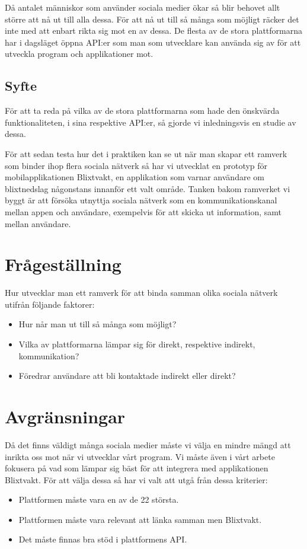 \documentclass{sigchi}
\begin{document}
Då antalet människor som använder sociala medier ökar så blir behovet allt större att nå ut till alla dessa. 
För att nå ut till så många som möjligt räcker det inte med att enbart rikta sig mot en av dessa. De 
flesta av de stora plattformarna har i dagsläget öppna API:er som man som utvecklare kan använda sig av 
för att utveckla program och applikationer mot.

\subsection{Syfte}
För att ta reda på vilka av de stora plattformarna som hade den önskvärda funktionaliteten, 
i sina respektive API:er, så gjorde vi inledningsvis en studie av dessa.

För att sedan testa hur det i praktiken kan se ut när man skapar ett ramverk som binder 
ihop flera sociala nätverk så har vi utvecklat en prototyp för mobilapplikationen Blixtvakt, 
en applikation som varnar användare om blixtnedslag någonstans innanför ett valt område. Tanken 
bakom ramverket vi byggt är att försöka utnyttja sociala nätverk som en kommunikationskanal mellan 
appen och användare, exempelvis för att skicka ut information, samt mellan användare.

\section{Frågeställning}
Hur utvecklar man ett ramverk för att binda samman olika sociala nätverk utifrån följande faktorer:
\begin{itemize}
	\item Hur når man ut till så många som möjligt?
	\item Vilka av plattformarna lämpar sig för direkt, respektive indirekt, kommunikation?
	\item Föredrar användare att bli kontaktade indirekt eller direkt? 
\end{itemize}
\section{Avgränsningar}
Då det finns väldigt många sociala medier måste vi välja en mindre mängd att inrikta oss mot 
när vi utvecklar vårt program. Vi måste även i vårt arbete fokusera på vad som lämpar sig bäst 
för att integrera med applikationen Blixtvakt. För att välja dessa så har vi valt att utgå 
från dessa kriterier:
\begin{itemize}
	\item Plattformen måste vara en av de 22 största\cite{STATISTA_LEADING_SOCIAL_NETWORKS}.
	\item Plattformen måste vara relevant att länka samman men Blixtvakt.
	\item Det måste finnas bra stöd i plattformens API.
\end{itemize}
\balance{}



\end{document}
